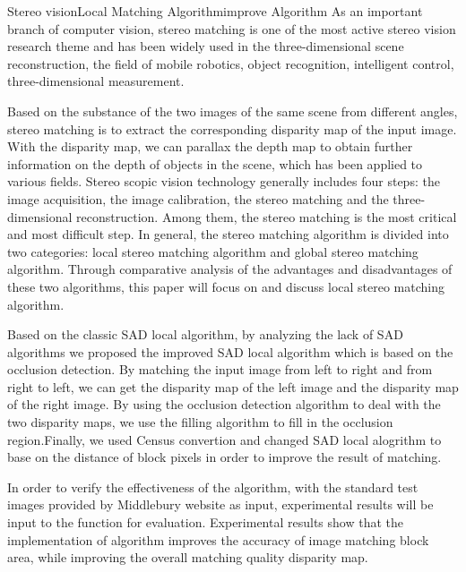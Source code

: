 
\begin{Eabstract}{Stereo vision}{Local Matching Algorithm}{improve Algorithm}{}{}
As  an  important  branch  of  computer  vision,  stereo  matching  is  one  of  the  most 
active stereo vision research theme and has been widely used in the three-dimensional 
scene reconstruction, the field of mobile robotics, object recognition, intelligent control, 
three-dimensional measurement. 

Based on the substance of the two images of the same scene from different angles, 
stereo matching is to extract the corresponding disparity map of the input image. With 
the disparity map, we can parallax the depth map to obtain further information on the 
depth  of  objects  in  the  scene,  which  has  been  applied  to  various  fields.  Stereo  scopic 
vision  technology  generally  includes  four  steps:  the  image  acquisition,  the  image 
calibration, the stereo matching and the three-dimensional reconstruction. Among them, 
the  stereo  matching  is  the  most  critical  and  most  difficult  step.  In  general,  the  stereo 
matching algorithm is divided into two categories: local stereo matching algorithm and 
global stereo matching algorithm. Through comparative analysis of the advantages and 
disadvantages of these two algorithms, this paper will focus on and discuss local stereo 
matching algorithm. 

Based  on  the  classic SAD local  algorithm,  by  analyzing  the  lack  of  SAD 
algorithms we proposed the improved SAD local algorithm which is based on the  
occlusion  detection.  By  matching  the  input  image  from  left  to  right  and  from  right  to 
left, we  can  get the disparity map of the left image and the disparity map of the right 
image. By using the occlusion detection algorithm to  deal with the two disparity 
maps, we use the filling algorithm to fill in the occlusion region.Finally, we used Census convertion 
and changed SAD local alogrithm to base on the distance of block pixels in order to improve the result of matching.

In order to verify the effectiveness of the algorithm, with the standard test images 
provided by Middlebury website as input, experimental results will be input to the 
function for evaluation. Experimental results show that the implementation of algorithm improves the 
accuracy of image matching block  area, while improving the overall matching quality 
disparity map. 
\end{Eabstract}
